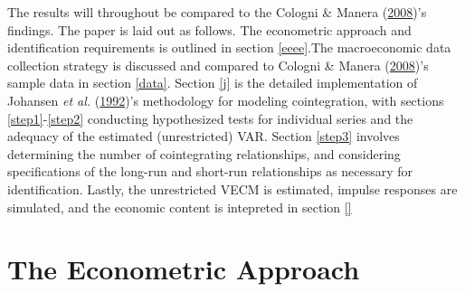 \documentclass[11pt,preprint, authoryear]{elsarticle}
\numberwithin{equation}{section}
\numberwithin{figure}{section}
\numberwithin{table}{section}
\begin{document}
The results will throughout be compared to the Cologni \& Manera
(\protect\hyperlink{ref-cologni2008}{2008})'s findings. The paper is
laid out as follows. The econometric approach and identification
requirements is outlined in section \ref{eeee}.The macroeconomic data
collection strategy is discussed and compared to Cologni \& Manera
(\protect\hyperlink{ref-cologni2008}{2008})'s sample data in section
\ref{data}. Section \ref{j} is the detailed implementation of Johansen
\emph{et al.} (\protect\hyperlink{ref-johansen1992}{1992})'s methodology
for modeling cointegration, with sections \ref{step1}-\ref{step2}
conducting hypothesized tests for individual series and the adequacy of
the estimated (unrestricted) VAR. Section \ref{step3} involves
determining the number of cointegrating relationships, and considering
specifications of the long-run and short-run relationships as necessary
for identification. Lastly, the unrestricted VECM is estimated, impulse
responses are simulated, and the economic content is intepreted in
section \ref{}

\hypertarget{the-econometric-approach}{%
\section{\texorpdfstring{The Econometric Approach
\label{eeee}}{The Econometric Approach }}\label{the-econometric-approach}}
\end{document}
